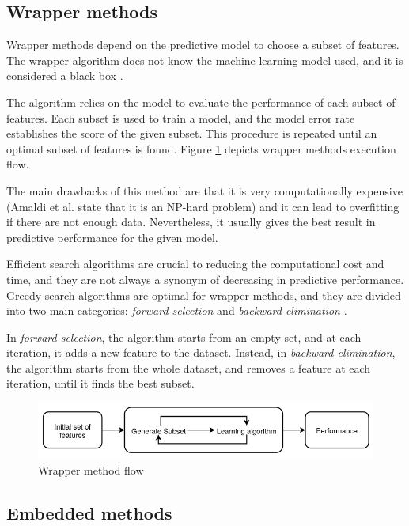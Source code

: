\subsection{Wrapper methods}
\label{sec:wrapper}
Wrapper methods depend on the predictive model to choose a subset of features. The wrapper algorithm does not know the machine learning model used, and it is considered a black box \cite{kohavi1997wrappers}. 

The algorithm relies on the model to evaluate the performance of each subset of features. Each subset is used to train a model, and the model error rate establishes the score of the given subset. This procedure is repeated until an optimal subset of features is found. Figure \ref{fig:wrapper} depicts wrapper methods execution flow.

The main drawbacks of this method are that it is very computationally expensive (Amaldi et al. \cite{amaldi1998approximability} state that it is an NP-hard problem) and it can lead to overfitting if there are not enough data. Nevertheless, it usually gives the best result in predictive performance for the given model.

Efficient search algorithms are crucial to reducing the computational cost and time, and they are not always a synonym of decreasing in predictive performance. Greedy search algorithms are optimal for wrapper methods, and they are divided into two main categories: \textit{forward selection} and \textit{backward elimination} \cite{reunanen2003overfitting}.

In \textit{forward selection}, the algorithm starts from an empty set, and at each iteration, it adds a new feature to the dataset. Instead, in \textit{backward elimination}, the algorithm starts from the whole dataset, and removes a feature at each iteration, until it finds the best subset.

\begin{figure}[!h]
	\centering
	\includegraphics[width=1.0\columnwidth]{wrapper2}
	\caption{Wrapper method flow}
	\label{fig:wrapper}
\end{figure}



\subsection{Embedded methods}

